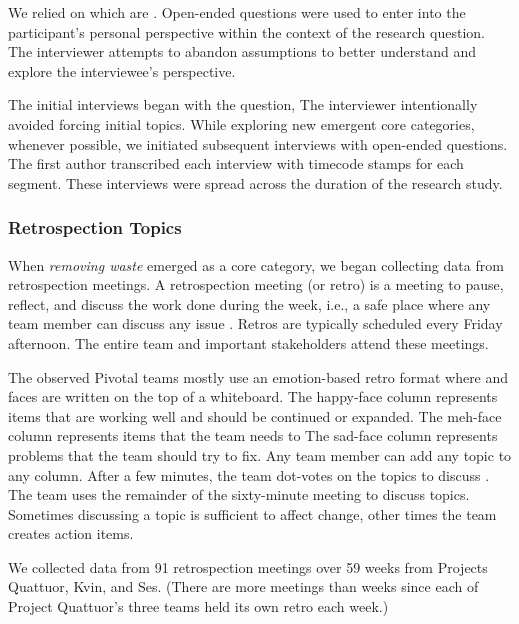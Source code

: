 We relied on  which are  \cite{Charmaz}. Open-ended questions were used to enter into the participant's personal perspective within the context of the research question. The interviewer attempts to abandon assumptions to better understand and explore the interviewee's perspective. 

The initial interviews began with the question,  The interviewer intentionally avoided forcing initial topics. While exploring new emergent core categories, whenever possible, we initiated subsequent interviews with open-ended questions. The first author transcribed each interview with timecode stamps for each segment. These interviews were spread across the duration of the research study. 
\subsubsection{Retrospection Topics}
When \textit{removing waste} emerged as a core category, we began collecting data from retrospection meetings. A retrospection meeting (or retro) is a meeting to pause, reflect, and discuss the work done during the week, i.e., a safe place where any team member can discuss any issue \cite{DerbyAgileRetrospectives}. Retros are typically scheduled every Friday afternoon. The entire team and important stakeholders attend these meetings. 

The observed Pivotal teams mostly use an emotion-based retro format where   and  faces are written on the top of a whiteboard. The happy-face column represents items that are working well and should be continued or expanded. The meh-face column represents items that the team needs to  The sad-face column represents problems that the team should try to fix. Any team member can add any topic to any column. After a few minutes, the team dot-votes on the topics to discuss \cite{DerbyAgileRetrospectives}. The team uses the remainder of the sixty-minute meeting to discuss topics. Sometimes discussing a topic is sufficient to affect change, other times the team creates action items. 

We collected data from 91 retrospection meetings over 59 weeks from Projects Quattuor, Kvin, and Ses. (There are more meetings than weeks since each of Project Quattuor's three teams held its own retro each week.)

